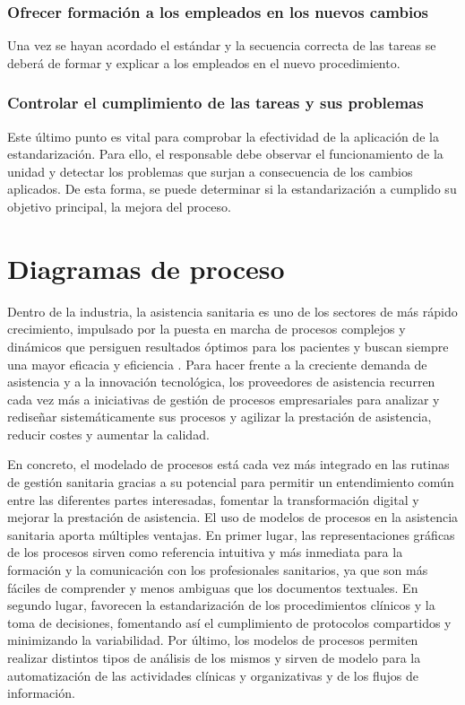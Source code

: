 \subsubsection{Ofrecer formación a los empleados en los nuevos cambios}

Una vez se hayan acordado el estándar y la secuencia correcta de las tareas se deberá de formar y explicar a los empleados en el nuevo procedimiento.

\subsubsection{Controlar el cumplimiento de las tareas y sus problemas}

Este último punto es vital para comprobar la efectividad de la aplicación de la estandarización. Para ello, el responsable debe observar el funcionamiento de la unidad y detectar los problemas que surjan a consecuencia de los cambios aplicados. De esta forma, se puede determinar si la estandarización a cumplido su objetivo principal, la mejora del proceso.

\section{Diagramas de proceso}

Dentro de la industria, la asistencia sanitaria es uno de los sectores de más rápido crecimiento, impulsado por la puesta en marcha de procesos complejos y dinámicos que persiguen resultados óptimos para los pacientes y buscan siempre una mayor eficacia y eficiencia \cite{pufahl_bpmn_2022}.
Para hacer frente a la creciente demanda de asistencia y a la innovación tecnológica, los proveedores de asistencia recurren cada vez más a iniciativas de gestión de procesos empresariales para analizar y rediseñar sistemáticamente sus procesos y agilizar la prestación de asistencia, reducir costes y aumentar la calidad.

En concreto, el modelado de procesos está cada vez más integrado en las rutinas de gestión sanitaria gracias a su potencial para permitir un entendimiento común entre las diferentes partes interesadas, fomentar la transformación digital y mejorar la prestación de asistencia.
El uso de modelos de procesos en la asistencia sanitaria aporta múltiples ventajas.
En primer lugar, las representaciones gráficas de los procesos sirven como referencia intuitiva y más inmediata para la formación y la comunicación con los profesionales sanitarios, ya que son más fáciles de comprender y menos ambiguas que los documentos textuales.
En segundo lugar, favorecen la estandarización de los procedimientos clínicos y la toma de decisiones, fomentando así el cumplimiento de protocolos compartidos y minimizando la variabilidad.
Por último, los modelos de procesos permiten realizar distintos tipos de análisis de los mismos y sirven de modelo para la automatización de las actividades clínicas y organizativas y de los flujos de información.

